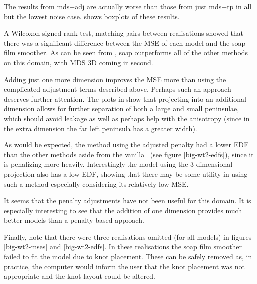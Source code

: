 The results from mds+adj are actually worse than those from just mds+tp in all but the lowest noise case.  shows boxplots of these results.

A Wilcoxon signed rank test, matching pairs between realisations showed that there was a significant difference between the MSE of each model and the soap film smoother. As can be seen from , soap outperforms all of the other methods on this domain, with MDS 3D coming in second. 

Adding just one more dimension improves the MSE more than using the complicated adjustment terms described above. Perhaps such an approach deserves further attention. The plots in  show that projecting into an additional dimension allows for further separation of both a large and small peninsulae, which should avoid leakage as well as perhaps help with the anisotropy (since in the extra dimension the far left peninsula has a greater width). 

As would be expected, the method using the adjusted penalty had a lower EDF than the other methods aside from the vanilla \tprss\ (see figure \ref{big-wt2-edfs}), since it is penalizing more heavily. Interestingly the model using the 3-dimensional projection also has a low EDF, showing that there may be some utility in using such a method especially considering its relatively low MSE.

It seems that the penalty adjustments have not been useful for this domain. It is especially interesting to see that the addition of one dimension provides much better models than a penalty-based approach.

Finally, note that there were three realisations omitted (for all models) in figures \ref{big-wt2-mses} and \ref{big-wt2-edfs}. In these realisations the soap film smoother failed to fit the model due to knot placement. These can be safely removed as, in practice, the computer would inform the user that the knot placement was not appropriate and the knot layout could be altered.

